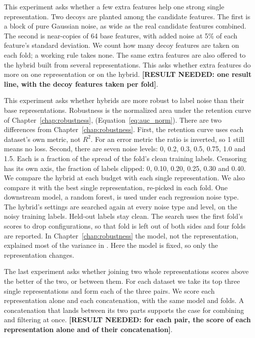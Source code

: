 This experiment asks whether a few extra features help one strong single representation. Two decoys are planted among the candidate features. The first is a block of pure Gaussian noise, as wide as the real candidate features combined. The second is near-copies of 64 base features, with added noise at 5\% of each feature's standard deviation. We count how many decoy features are taken on each fold; a working rule takes none. The same extra features are also offered to the hybrid built from several representations. This asks whether extra features do more on one representation or on the hybrid. \textbf{[RESULT NEEDED: one result line, with the decoy features taken per fold]}.

This experiment asks whether hybrids are more robust to label noise than their base representations. Robustness is the normalized area under the retention curve of Chapter~\ref{chap:robustness}, \aucnorm (Equation~\ref{eq:auc_norm}). There are two differences from Chapter~\ref{chap:robustness}. First, the retention curve uses each dataset's own metric, not $R^2$. For an error metric the ratio is inverted, so 1 still means no loss. Second, there are seven noise levels: 0, 0.2, 0.3, 0.5, 0.75, 1.0 and 1.5. Each is a fraction of the spread of the fold's clean training labels. Censoring has its own axis, the fraction of labels clipped: 0, 0.10, 0.20, 0.25, 0.30 and 0.40. We compare the hybrid at each budget with each single representation. We also compare it with the best single representation, re-picked in each fold. One downstream model, a random forest, is used under each regression noise type. The hybrid's settings are searched again at every noise type and level, on the noisy training labels. Held-out labels stay clean. The search uses the first fold's scores to drop configurations, so that fold is left out of both sides and four folds are reported. In Chapter~\ref{chap:robustness} the model, not the representation, explained most of the variance in \aucnorm. Here the model is fixed, so only the representation changes.

The last experiment asks whether joining two whole representations scores above the better of the two, or between them. For each dataset we take its top three single representations and form each of the three pairs. We score each representation alone and each concatenation, with the same model and folds. A concatenation that lands between its two parts supports the case for combining and filtering at once. \textbf{[RESULT NEEDED: for each pair, the score of each representation alone and of their concatenation]}.


